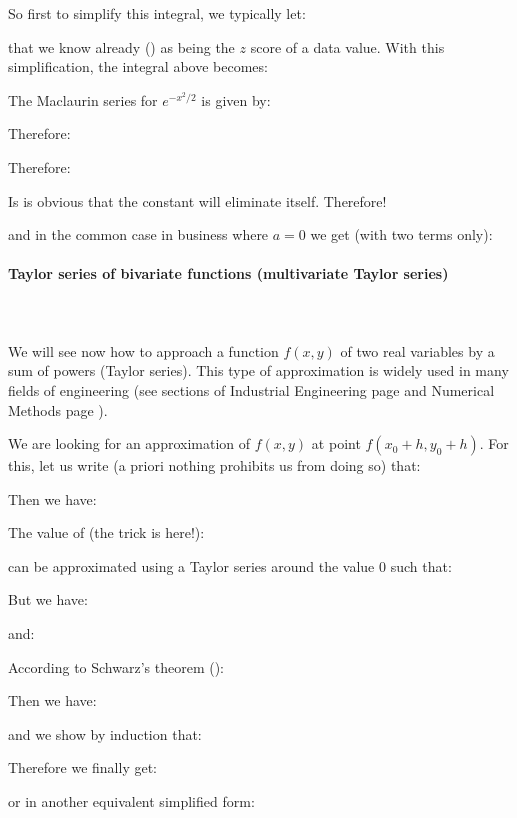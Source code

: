 \begin{enumerate}
		So first to simplify this integral, we typically let:
		
		that we know already () as being the $z$ score of a data value. With this simplification, the integral above becomes:
		
		The Maclaurin series for $e^{-x^2/2}$ is given by:
		
		Therefore:
		
		Therefore:
		
		Is is obvious that the constant will eliminate itself. Therefore!
		
		and in the common case in business where $a=0$ we get (with two terms only):
		
	\end{enumerate}
	
	\pagebreak
	\paragraph{Taylor series of bivariate functions (multivariate Taylor series)}\label{multivariate taylor series}\mbox{}\\\\
	We will see now how to approach a function $f (x, y)$ of two real variables by a sum of powers (Taylor series). This type of approximation is widely used in many fields of engineering (see sections of Industrial Engineering page \pageref{bivariat taylor expansion doe} and Numerical Methods page \pageref{newton raphson method}).
	
	We are looking for an approximation of $f (x, y)$ at point $f(x_0+h,y_0+h)$. For this, let us write (a priori nothing prohibits us from doing so) that:
	
	Then we have:
	
	The value of (the trick is here!):
	
	can be approximated using a Taylor series around the value $0$ such that:
	
	But we have:
	
	and:
	
	According to Schwarz's theorem ():
	
	Then we have:
	
	and we show by induction that:
	
	Therefore we finally get:
	
	or in another equivalent simplified form:
	
